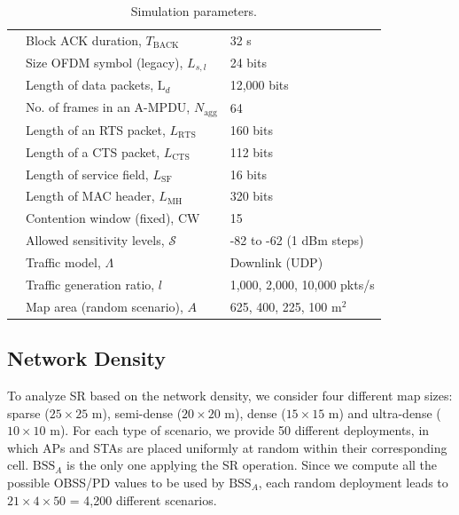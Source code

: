 \documentclass{article}
\begin{document}
\begin{table}[h]
{\begin{tabular}{c|l|l|}
			\cline{2-3} 
			\multicolumn{1}{|c|}{} & Block ACK duration, $T_\text{BACK}$ & 32 \textmu s \\
			\cline{2-3} 
			\multicolumn{1}{|c|}{} &  Size OFDM symbol (legacy), $L_{s,l}$ & 24 bits \\
			\cline{2-3} 
			\multicolumn{1}{|c|}{} & Length of data packets, $\text{L}_{d}$ & 12,000 bits \\
			\cline{2-3} 
			\multicolumn{1}{|c|}{} & No. of frames in an A-MPDU, $N_{\text{agg}}$ & 64 \\
			\cline{2-3} 
			\multicolumn{1}{|c|}{} & Length of an RTS packet, $L_\text{RTS}$ & 160 bits \\
			\cline{2-3} 
			\multicolumn{1}{|c|}{} & Length of a CTS packet, $L_\text{CTS}$ & 112 bits \\
			\cline{2-3} 
			\multicolumn{1}{|c|}{} & Length of service field, $L_\text{SF}$ & 16 bits  \\
			\cline{2-3} 
			\multicolumn{1}{|c|}{} & Length of MAC header, $L_\text{MH}$ & 320 bits \\
			\cline{2-3} 
			\multicolumn{1}{|c|}{} & Contention window (fixed), $\text{CW}$ & 15 \\
			\cline{2-3} 
			\multicolumn{1}{|c|}{} & Allowed sensitivity levels, $\mathcal{S}$ & -82 to -62 (1 dBm steps) \\
			\hline
			\multicolumn{1}{|c|}{\multirow{2}{*}{\centering\rotatebox[origin=c]{90}{Misc.  }}} & Traffic model, $\Lambda$ & Downlink (UDP)\\
			\cline{2-3} 
			\multicolumn{1}{|c|}{} & Traffic generation ratio, $l$ & 1,000, 2,000, 10,000 pkts/s\\ 
			\cline{2-3} 
			\multicolumn{1}{|c|}{} & Map area (random scenario), $A$ & 625, 400, 225, 100 m$^2$\\
			\hline
	\end{tabular}}
	\caption{Simulation parameters.}
	\label{table:parameters}
\end{table}

\subsection{Network Density}
\label{section:random_scenarios_density}
To analyze SR based on the network density, we consider four different map sizes: sparse ($25\times25$ m), semi-dense ($20\times20$ m), dense ($15\times15$ m) and ultra-dense ($10\times10$ m). For each type of scenario, we provide 50 different deployments, in which APs and STAs are placed uniformly at random within their corresponding cell. $\text{BSS}_A$ is the only one applying the SR operation. Since we compute all the possible OBSS/PD values to be used by $\text{BSS}_A$, each random deployment leads to $21\times4\times50$ = 4,200 different scenarios.
\end{document}
